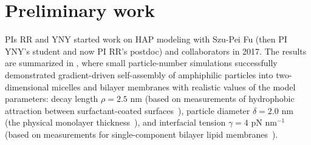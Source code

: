 \section{Preliminary work}
\label{sec:preliminary_work}
PIs RR and YNY started work on HAP modeling with Szu-Pei Fu (then PI YNY's student and now PI RR's postdoc) and collaborators in 2017. 
%
%
%
The results are summarized in \cite{Fu2018_SIAM}, where
small particle-number simulations successfully demonstrated gradient-driven self-assembly of
amphiphilic particles into two-dimensional micelles and bilayer membranes with realistic values of
the model parameters: decay length $\rho=2.5$ nm (based on measurements of
hydrophobic attraction between surfactant-coated
surfaces~\cite{Eriksson1989, Lin2005, Parsegian, Israelachvili80}),
particle diameter $\delta = 2.0$ nm (the physical monolayer thickness~\cite{Boal}),
and interfacial tension $\gamma = 4$ pN nm$^{-1}$ (based on
measurements for single-component bilayer lipid
membranes~\cite{GarciaSaez, KUZMIN2005, Petelska2012, Jackson2016}).


